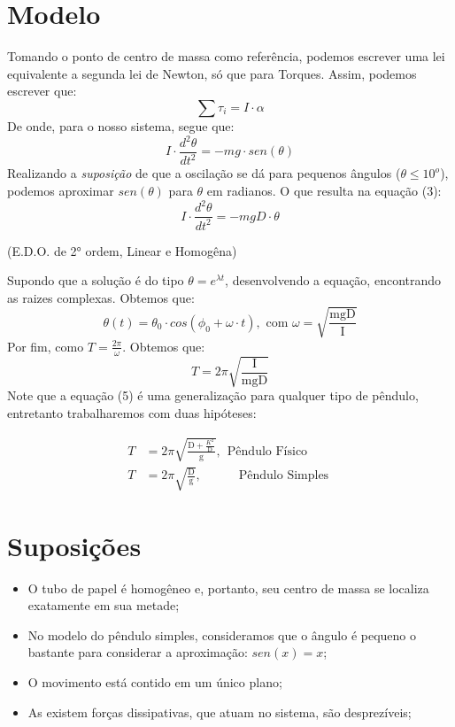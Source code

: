 \documentclass[a4paper]{report}
\begin{document}
\section*{Modelo}
\qquad Tomando o ponto de centro de massa como referência, 
podemos escrever uma lei equivalente a segunda lei de Newton, só que para Torques.
Assim, podemos escrever que:
\begin{equation}
    \sum{\tau_i} =  I\cdot \alpha
\end{equation}
\qquad De onde, para o nosso sistema, segue que:
\begin{equation}
    I \cdot \frac{d^2\theta}{dt ^2} = - mg\cdot sen(\theta)
\end{equation}
\qquad Realizando a \textit{suposição} de que a oscilação se dá para pequenos ângulos
($\theta \leq 10^{o} $), podemos aproximar $sen(\theta)$ para $\theta$ em radianos.
O que resulta na equação (3):
\begin{equation}
    I \cdot \frac{d^2\theta}{dt ^2} = - mgD\cdot \theta
\end{equation}
\begin{center}
    \small{(E.D.O. de 2° ordem, Linear e Homogêna)}
\end{center}
\qquad Supondo que a solução é do tipo $\theta = e^{\lambda t}$, desenvolvendo
a equação, encontrando as raizes complexas. Obtemos que:
\begin{equation}
    \theta(t) = \theta_0 \cdot cos\left( \phi_0 + \omega \cdot t\right), \text{ com } \omega = \sqrt{\frac{\text{mgD}}{\text{I}}}
\end{equation}
\qquad Por fim, como $T = \frac{2\pi}{\omega}$. Obtemos que:
\begin{equation}
   \boxed{T = 2\pi \sqrt{\frac{\text{I}}{\text{mgD}}}}
\end{equation}
\qquad Note que a equação (5) é uma generalização para qualquer
tipo de pêndulo, entretanto trabalharemos com duas hipóteses:


\begin{align}
        T &= 2\pi \sqrt{\frac{\text{D} + \frac{\text{$K^2$}}{\text{D}}}{\text{g}}}, \ \ \text{Pêndulo Físico }\\
        T &= 2\pi \sqrt{\frac{\text{D}}{\text{g}}},\quad \qquad \text{Pêndulo Simples }
\end{align}



\section*{Suposições}
\begin{itemize}
    \item O tubo de papel é homogêneo e, portanto, seu centro de massa se localiza exatamente em sua metade;
    \item No modelo do pêndulo simples, consideramos que o ângulo é pequeno o bastante para considerar a aproximação: \(sen(x) = x\);
    \item O movimento está contido em um único plano;
    \item As existem forças dissipativas, que atuam no sistema, são desprezíveis;
\end{itemize}
\end{document}
